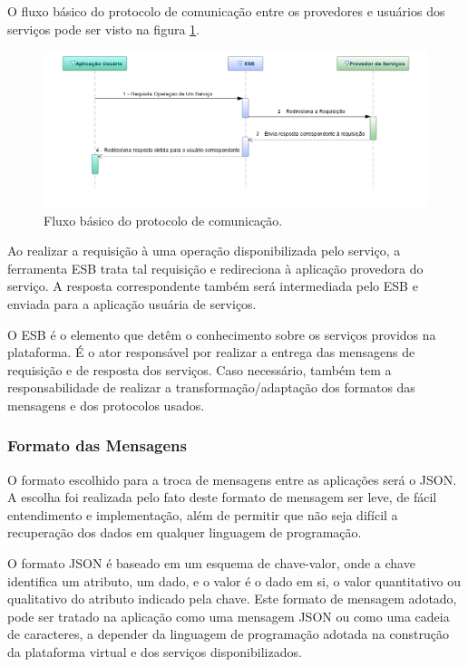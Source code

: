 O fluxo básico do protocolo de comunicação entre os provedores e usuários dos serviços pode ser visto na figura \ref{fluxo_basico_protocolo}.

\begin{figure}[htb]
\centering
\includegraphics[width=1\textwidth]{figuras/fluxo_basico_protocolo.png}
\caption{Fluxo básico do protocolo de comunicação.}
\label{fluxo_basico_protocolo}
\end{figure}

Ao realizar a requisição à uma operação disponibilizada pelo serviço, a ferramenta ESB trata tal requisição e redireciona à aplicação provedora do serviço. A resposta correspondente também será intermediada pelo ESB e enviada para a aplicação usuária de serviços.

O ESB é o elemento que detêm o conhecimento sobre os serviços providos na plataforma. É o ator responsável por realizar a entrega das mensagens de requisição e de resposta dos serviços. Caso necessário, também tem a  responsabilidade de realizar a transformação/adaptação dos formatos das mensagens e dos protocolos usados.

\subsubsection{Formato das Mensagens}
O formato escolhido para a troca de mensagens entre as aplicações será o JSON. A escolha foi realizada pelo fato deste formato de mensagem ser leve, de fácil entendimento e implementação, além de permitir que não seja difícil a recuperação dos dados em qualquer linguagem de programação.

O formato JSON é baseado em um esquema de chave-valor, onde a chave identifica um atributo, um dado, e o valor é o dado em si, o valor quantitativo ou qualitativo do atributo indicado pela chave. Este formato de mensagem adotado, pode ser tratado na aplicação como uma mensagem JSON ou como uma cadeia de caracteres, a depender da linguagem de programação adotada na construção da plataforma virtual e dos serviços disponibilizados.

